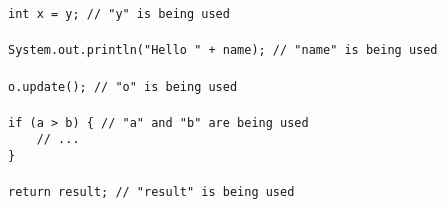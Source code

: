 \verb$int x = y; // "y" is being used$\\
\verb$$\\
\verb$System.out.println("Hello " + name); // "name" is being used$\\
\verb$$\\
\verb$o.update(); // "o" is being used$\\
\verb$$\\
\verb$if (a > b) { // "a" and "b" are being used$\\
\verb$    // ...$\\
\verb$}$\\
\verb$$\\
\verb$return result; // "result" is being used$\\